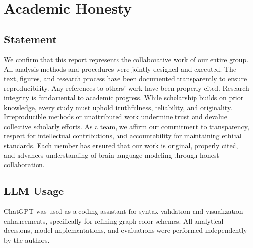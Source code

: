 \documentclass{article}
\begin{document}
\section{Academic Honesty}

\subsection{Statement}

We confirm that this report represents the collaborative work of our entire group. All analysis methods and procedures were jointly designed and executed. The text, figures, and research process have been documented transparently to ensure reproducibility. Any references to others’ work have been properly cited. Research integrity is fundamental to academic progress. While scholarship builds on prior knowledge, every study must uphold truthfulness, reliability, and originality. Irreproducible methods or unattributed work undermine trust and devalue collective scholarly efforts. As a team, we affirm our commitment to transparency, respect for intellectual contributions, and accountability for maintaining ethical standards. Each member has ensured that our work is original, properly cited, and advances understanding of brain-language modeling through honest collaboration.

\subsection{LLM Usage}

ChatGPT was used as a coding assistant for syntax validation and visualization enhancements, specifically for refining graph color schemes. All analytical decisions, model implementations, and evaluations were performed independently by the authors.



\end{document}
